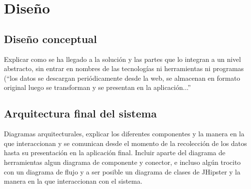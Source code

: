 \chapter{Diseño}
\section{Diseño conceptual}
Explicar como se ha llegado a la solución y las partes que lo integran a un nivel abstracto, sin entrar en nombres de las tecnologías ni herramientas ni programas (“los datos se descargan periódicamente desde la web, se almacenan en formato original luego se transforman y se presentan en la aplicación...”
\section{Arquitectura final del sistema}
Diagramas arquitecturales, explicar los diferentes componentes y la manera en la que interaccionan y se comunican desde el momento de la recolección de los datos hasta su presentación en la aplicación final. Incluir aparte del diagrama de herramientas algun diagrama de componente y conector, e incluso algún trocito con un diagrama de flujo y a ser posible un diagrama de clases de JHipster y la manera en la que interaccionan con el sistema.
